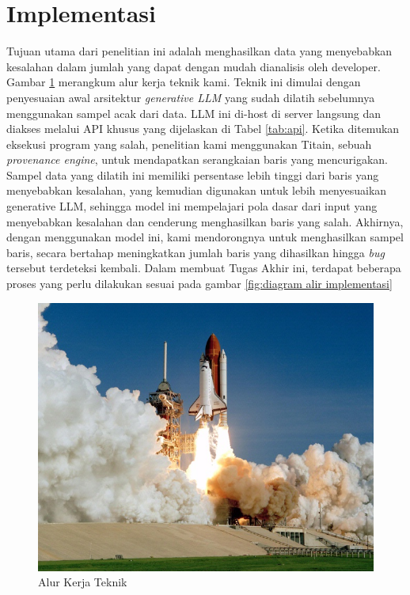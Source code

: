 \section{Implementasi}
\label{sec:implementasi}
Tujuan utama dari penelitian ini adalah menghasilkan data 
yang menyebabkan kesalahan dalam jumlah yang dapat dengan 
mudah dianalisis oleh developer. 
Gambar \ref{fig:alur kerja teknik} merangkum alur 
kerja teknik kami. Teknik ini dimulai 
dengan penyesuaian awal arsitektur \emph{generative LLM} yang 
sudah dilatih sebelumnya menggunakan sampel acak dari data. 
LLM ini di-host di server langsung dan diakses melalui API 
khusus yang dijelaskan di Tabel \ref{tab:api}. Ketika ditemukan eksekusi 
program yang salah, penelitian kami menggunakan Titain, sebuah 
\emph{provenance engine}, untuk mendapatkan serangkaian baris yang 
mencurigakan. Sampel data yang dilatih ini memiliki 
persentase lebih tinggi dari baris yang menyebabkan kesalahan, 
yang kemudian digunakan untuk lebih menyesuaikan generative 
LLM, sehingga model ini mempelajari pola dasar dari input yang 
menyebabkan kesalahan dan cenderung menghasilkan baris 
yang salah. Akhirnya, dengan menggunakan model ini, 
kami mendorongnya untuk menghasilkan 
sampel baris, secara bertahap meningkatkan jumlah baris 
yang dihasilkan hingga \emph{bug} tersebut terdeteksi kembali.
Dalam membuat Tugas Akhir ini, terdapat beberapa proses 
yang perlu dilakukan sesuai pada gambar \ref{fig:diagram alir implementasi}

\begin{figure}[H]
  \centering
  \includegraphics[scale=0.35]{gambar/roketluarangkasa.jpg}

  \caption{Alur Kerja Teknik}
  \label{fig:alur kerja teknik}
\end{figure}

